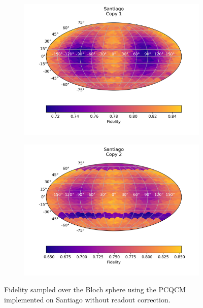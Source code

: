   \begin{figure}[H]
    \centering
    \begin{subfigure}{.5\textwidth}
      \centering
      \includegraphics[width=\textwidth]{Figures/PhaseCovariant/IBM/FullSphere/results_santiago_copy1.png}
      
      \label{fig:pc_uncorrected_santiago_sphere_1}
    \end{subfigure}%
    \begin{subfigure}{.5\textwidth}
      \centering
      \includegraphics[width=\textwidth]{Figures/PhaseCovariant/IBM/FullSphere/results_santiago_copy2.png}
      
      \label{fig:pc_uncorrected_santiago_sphere_2}
    \end{subfigure}
    \caption{Fidelity sampled over the Bloch sphere using the PCQCM implemented on Santiago without readout correction.}
    \label{fig:pc_uncorrected_santiago_sphere}
  \end{figure}
  
